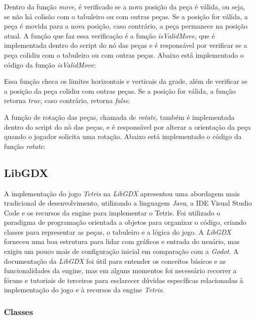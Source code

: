 

Dentro da função \textit{move}, é verificado se a nova posição da peça é válida, ou seja, se não há colisão com o tabuleiro ou com outras peças. Se a posição for válida, a peça é movida para a nova posição, caso contrário, a peça permanece na posição atual. A função que faz essa verificação é a função \textit{isValidMove}, que é implementada dentro do script do nó das peças e é responsável por verificar se a peça colidiu com o tabuleiro ou com outras peças. Abaixo está implementado o código da função \textit{isValidMove}:



Essa função checa os limites horizontais e verticais da grade, além de verificar se a posição da peça colidiu com outras peças. Se a posição for válida, a função retorna \textit{true}, caso contrário, retorna \textit{false}.

A função de rotação das peças, chamada de \textit{rotate}, também é implementada dentro do script do nó das peças, e é responsável por alterar a orientação da peça quando o jogador solicita uma rotação. Abaixo está implementado o código da função \textit{rotate}:



\subsection{LibGDX}

A implementação do jogo \textit{Tetris} na \textit{LibGDX} apresentou uma abordagem mais tradicional de desenvolvimento, utilizando a linguagem \textit{Java}, a IDE Visual Studio Code e os recursos da engine para implementar o Tetris.
Foi utilizado o paradigma de programação orientada a objetos para organizar o código, criando classes para representar as peças, o tabuleiro e a lógica do jogo. A \textit{LibGDX} forneceu uma boa estrutura para lidar com gráficos e entrada do usuário, mas exigiu um pouco mais de configuração inicial em comparação com a \textit{Godot}. A documentação da \textit{LibGDX} foi útil para entender os conceitos básicos e as funcionalidades da engine, mas em alguns momentos foi necessário recorrer a fóruns e tutoriais de terceiros para esclarecer dúvidas específicas relacionadas à implementação do jogo e à recursos da engine \textit{Tetris}.

\subsubsection{Classes}

